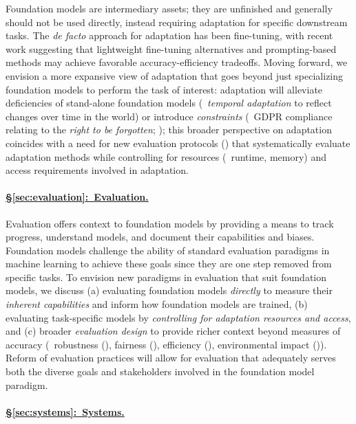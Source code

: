 Foundation models are intermediary assets; they are unfinished and generally should not be used directly, instead requiring adaptation for specific downstream tasks.
The \textit{de facto} approach for adaptation has been fine-tuning, with recent work suggesting that lightweight fine-tuning alternatives and prompting-based methods may achieve favorable accuracy-efficiency tradeoffs.
Moving forward, we envision a more expansive view of adaptation that goes beyond just specializing foundation models to perform the task of interest: adaptation will alleviate deficiencies of stand-alone foundation models (\eg~\textit{temporal adaptation} to reflect changes over time in the world) or introduce \textit{constraints} (\eg~GDPR compliance relating to the \textit{right to be forgotten}; ); this broader perspective on adaptation coincides with a need for new evaluation protocols () that systematically evaluate adaptation methods while controlling for resources (\eg~runtime, memory) and access requirements involved in adaptation.

\paragraph{\hyperref[sec:evaluation]{§\ref{sec:evaluation}:~Evaluation.}}

Evaluation offers context to foundation models by providing a means to track progress, understand models, and document their capabilities and biases. 
Foundation models challenge the ability of standard evaluation paradigms in machine learning to achieve these goals since they are one step removed from specific tasks. 
To envision new paradigms in evaluation that suit foundation models, we discuss (a) evaluating foundation models \textit{directly} to measure their \textit{inherent capabilities} and inform how foundation models are trained, (b) evaluating task-specific models by \textit{controlling for adaptation resources and access}, and (c) broader \textit{evaluation design} to provide richer context beyond measures of accuracy (\eg~robustness (), fairness (), efficiency (), environmental impact ()). 
Reform of evaluation practices will allow for evaluation that adequately serves both the diverse goals and stakeholders involved in the foundation model paradigm.

\paragraph{\hyperref[sec:systems]{§\ref{sec:systems}:~Systems.}}

